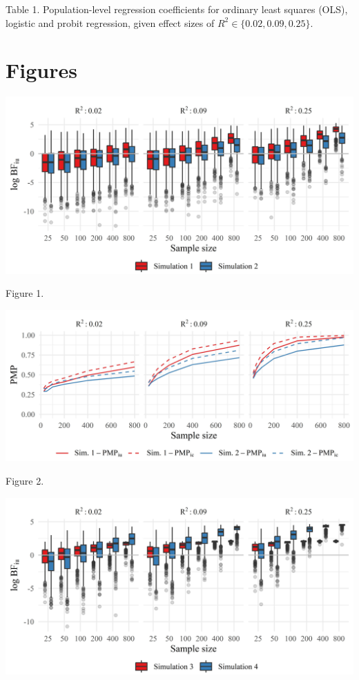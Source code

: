\documentclass[
]{interact}
\begin{document}
Table 1. Population-level regression coefficients for ordinary least
squares (OLS), logistic and probit regression, given effect sizes of
\(R^2 \in \{0.02, 0.09, 0.25\}\).

\newpage{}

\hypertarget{figures}{%
\section{Figures}\label{figures}}

\includegraphics[width=1\textwidth,height=\textheight]{figures/figure-1.jpeg}

Figure 1.

\includegraphics[width=1\textwidth,height=\textheight]{figures/figure-2.jpeg}

Figure 2.

\includegraphics[width=1\textwidth,height=\textheight]{figures/figure-3.jpeg}
\end{document}
